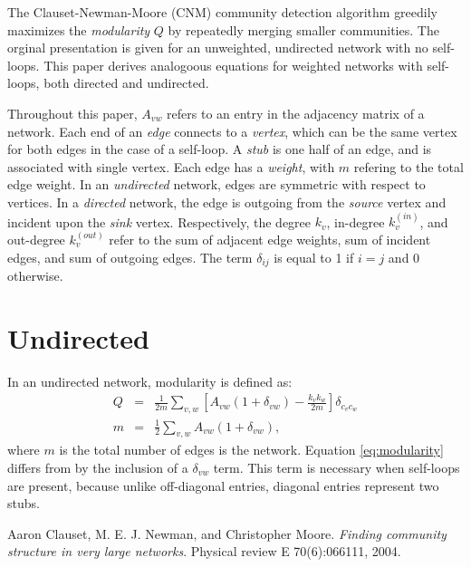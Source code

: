 \documentclass{article}
\newcommand{\beq}{\begin{eqnarray}}
\newcommand{\eeq}{\end{eqnarray}}
\begin{document}
The Clauset-Newman-Moore (CNM) community detection algorithm \cite{clauset_finding_2004}
greedily maximizes the {\em modularity} $Q$ by repeatedly merging smaller communities.
The orginal presentation is given for an unweighted, undirected network with no self-loops.
This paper derives analogoous equations for weighted networks with self-loops,
both directed and undirected.

Throughout this paper, $A_{vw}$ refers to an entry in the adjacency matrix of a network.
Each end of an {\em edge} connects to a {\em vertex},
which can be the same vertex for both edges in the case of a self-loop.
A {\em stub} is one half of an edge, and is associated with single vertex.
Each edge has a {\em weight}, with $m$ refering to the total edge weight.
In an {\em undirected} network, edges are symmetric with respect to vertices.
In a {\em directed} network, the edge is outgoing from the {\em source} vertex
and incident upon the {\em sink} vertex.
Respectively, the degree $k_v$, in-degree $k_v^{(in)}$, and out-degree $k_v^{(out)}$ refer to the
sum of adjacent edge weights, sum of incident edges, and sum of outgoing edges.
The term $\delta_{ij}$ is equal to 1 if $i = j$ and 0 otherwise.

\section{Undirected}
In an undirected network, modularity is defined as:
\beq
\label{eq:modularity} Q &=& \frac{1}{2m} \sum_{v,w} \left[ A_{vw} (1 + \delta_{vw}) - \frac{k_v k_w}{2m} \right]\delta_{c_v c_w} \\
m &=& \frac{1}{2} \sum_{v,w} A_{vw} (1 + \delta_{vw}),
\eeq
where $m$ is the total number of edges is the network.
Equation \ref{eq:modularity} differs from \cite{clauset_finding_2004} by the inclusion of a $\delta_{vw}$ term.
This term is necessary when self-loops are present,
because unlike off-diagonal entries, diagonal entries represent two stubs.

\begin{thebibliography}{1}
Aaron Clauset, M. E. J. Newman, and Christopher Moore.
\textit{Finding community structure in very large networks}. 
Physical review E 70(6):066111, 2004.
\end{thebibliography}
\end{document}
